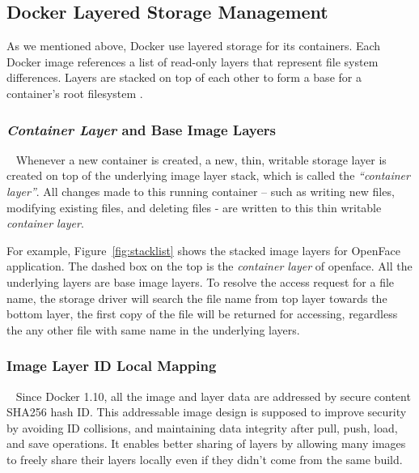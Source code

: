 

\subsection{Docker Layered Storage Management}\label{aufsIntroduction}

As we mentioned above, Docker use layered storage for its containers. Each Docker image references a list of read-only layers that represent file system differences. Layers are stacked on top of each other to form a base for a container’s root filesystem \cite{dockerlayer}. 

\smallbreak
\subsubsection{\textit{Container Layer} and Base Image Layers}
~\smallbreak
Whenever a new container is created, a new, thin, writable storage layer is created on top of the underlying image layer stack, which is called the \textit{``container layer''}. All changes made to this running container -- such as writing new files, modifying existing files, and deleting files - are written to this thin writable \textit{container layer}\cite{dockerlayer}.

For example, 
Figure~\ref{fig:stacklist} shows the stacked image layers for OpenFace application. The dashed box on the top is the \textit{container layer} of openface. All the underlying layers are base image layers. To resolve the access request for a file name, the storage driver will search the file name from top layer towards the bottom layer, the first copy of the file will be returned for accessing, regardless the any other file with same name in the underlying layers.




\smallbreak
\subsubsection{Image Layer ID Local Mapping}
~\smallbreak
Since Docker 1.10, all the image and layer data are addressed by secure content SHA256 hash ID. 
This addressable image design is supposed to improve security by avoiding ID collisions, and maintaining data integrity after pull, push, load, and save operations. It enables better sharing of layers by allowing many images to freely share their layers locally even if they didn’t come from the same build\cite{dockerlayer}. 

